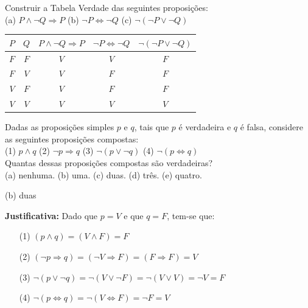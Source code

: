 \documentclass[12pt, a4paper, onecolumn]{exam}
\begin{document}
\begin{questions}
    \question[q4] Construir a Tabela Verdade das seguintes proposições: \\[1em]
    (a) \( P \wedge \neg Q \Rightarrow P \) \hfill
    (b) \( \neg P \iff \neg Q \)            \hfill
    (c) \( \neg (\neg P \vee \neg Q) \)     

    \begin{solution}
        \begin{tabular}{| c | c || c | c | c |} 
         \hline
            \( P \) & \( Q \) &
            \( P \wedge \neg Q \Rightarrow P \) &
            \( \neg P \iff \neg Q \)  &
            \( \neg (\neg P \vee \neg Q) \) \\
         \hline
         \hline
         \( F \) & \( F \) & \( V \) & \( V \) &  \( F \) \\
         \hline
         \( F \) & \( V \) & \( V \) & \( F \) &  \( F \) \\
         \hline
         \( V \) & \( F \) & \( V \) & \( F \) &  \( F \) \\
         \hline
         \( V \) & \( V \) & \( V \) & \( V \) &  \( V \) \\
         \hline
        \end{tabular}
    \end{solution}

    \pagebreak
    
    \question[q5] Dadas as proposições simples \(p\) e \(q\), tais que \(p\) é verdadeira e \(q\) é falsa, considere as seguintes proposições compostas: \\[1em] 
        (1) \( p \wedge q \) \hfill
        (2) \( \neg p \Rightarrow q \) \hfill
        (3) \( \neg ( p \vee \neg q ) \) \hfill
        (4) \( \neg ( p \iff q ) \) \\[1em] 
    Quantas dessas proposições compostas são verdadeiras? \\[1em]
        (a) nenhuma. \hfil
        (b) uma.     \hfil
        (c) duas.    \hfil
        (d) três.    \hfil
        (e) quatro.
    
    \begin{solution}
        (b) duas
        
        \textbf{Justificativa:}  Dado que \( p = V\) e que \( q = F \), tem-se que:
        
        \begin{itemize}
            \item[(1)] \( (p \wedge q) = (V \wedge F) = F\) 
            \item[(2)] \( (\neg p \Rightarrow q ) = ( \neg V \Rightarrow F ) = ( F \Rightarrow F ) = V\)
            \item[(3)] \( \neg ( p \vee \neg q ) = \neg ( V \vee \neg F ) = \neg ( V \vee V ) = \neg V = F \)
            \item[(4)] \( \neg ( p \iff q ) = \neg ( V \iff F ) = \neg F = V \)
        \end{itemize}


\end{solution}
\end{questions}
\end{document}
